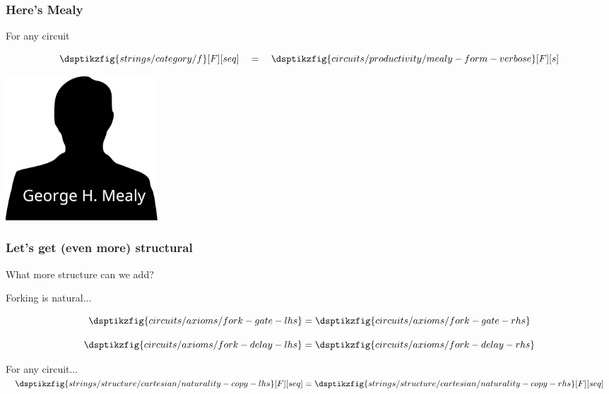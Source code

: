 \begin{frame}
    \frametitle{Here's Mealy}

    \centering
    For \alert{any} circuit

    \[
        \dsptikzfig{strings/category/f}[F][seq]
        \quad
        =
        \quad
        \dsptikzfig{circuits/productivity/mealy-form-verbose}[F][s]
    \]

    \includegraphics[width=0.25\textwidth]{imgs/mealy}

\end{frame}
\begin{frame}
    \frametitle{Let's get (even more) structural}

    What more structure can we add?

    \wait

    \alert{Forking} is natural...

    \wait

    \begin{axiom}
        \begin{minipage}{0.33\textwidth}
            \begin{equation*}
                \dsptikzfig{circuits/axioms/fork-gate-lhs}
                =
                \dsptikzfig{circuits/axioms/fork-gate-rhs}
            \end{equation*}
        \end{minipage}
        \begin{minipage}{0.33\textwidth}
            \begin{equation*}
                \dsptikzfig{circuits/axioms/fork-delay-lhs}
                =
                \dsptikzfig{circuits/axioms/fork-delay-rhs}
            \end{equation*}
        \end{minipage}
    \end{axiom}

    For any circuit...
    \(
        \dsptikzfig{strings/structure/cartesian/naturality-copy-lhs}[F][seq]
        =
        \dsptikzfig{strings/structure/cartesian/naturality-copy-rhs}[F][seq]
    \)
\end{frame}
